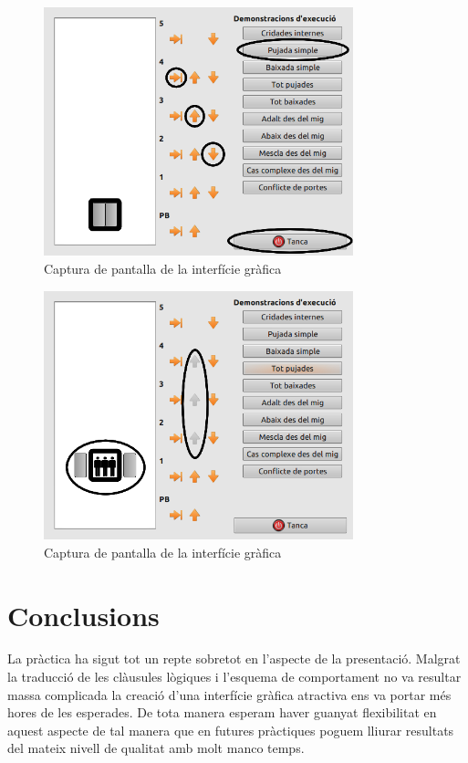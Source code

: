 \documentclass[a4paper, 11pt]{article}
\begin{document}
\begin{figure}
\begin{center}
\includegraphics[width=0.8\textwidth]{pantalla-1.png}
\caption{Captura de pantalla de la interfície gràfica}
\label{captura1}
\end{center}
\end{figure}

\begin{figure}
\begin{center}
\includegraphics[width=0.8\textwidth]{pantalla-2.png}
\caption{Captura de pantalla de la interfície gràfica}
\label{captura2}
\end{center}
\end{figure}


\newpage
\section{Conclusions}

La pràctica ha sigut tot un repte sobretot en l'aspecte de la
presentació. Malgrat la traducció de les clàusules lògiques i l'esquema de
comportament no va resultar massa complicada la creació d'una interfície
gràfica atractiva ens va portar més hores de les esperades. De tota manera
esperam haver guanyat flexibilitat en aquest aspecte de tal manera que en
futures pràctiques poguem lliurar resultats del mateix nivell de qualitat amb
molt manco temps.




\end{document}
